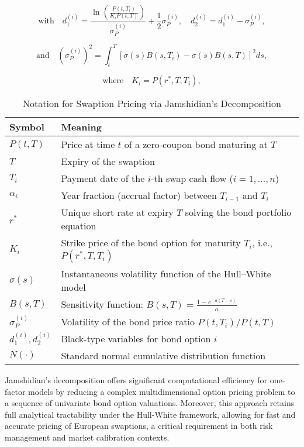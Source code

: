 \begin{equation}
\text{with} \quad d_1^{(i)} = \frac{\ln\left( \frac{P(t, T_i)}{K_i P(t, T)} \right)}{\sigma_P^{(i)}} + \frac{1}{2} \sigma_P^{(i)}, \quad d_2^{(i)} = d_1^{(i)} - \sigma_P^{(i)},
\end{equation}

\begin{equation}
\text{and} \quad \left( \sigma_P^{(i)} \right)^2 = \int_t^T \left[ \sigma(s) B(s, T_i) - \sigma(s) B(s, T) \right]^2 ds,
\end{equation}

\begin{equation}
\text{where} \quad K_i = P(r^*, T, T_i),
\end{equation}

\begin{table}[H]
\centering
\caption{Notation for Swaption Pricing via Jamshidian's Decomposition}
\begin{tabular}{ll}
\toprule
\textbf{Symbol} & \textbf{Meaning} \\
\midrule
$P(t, T)$ & Price at time $t$ of a zero-coupon bond maturing at $T$ \\
$T$ & Expiry of the swaption \\
$T_i$ & Payment date of the $i$-th swap cash flow ($i = 1, \dots, n$) \\
$\alpha_i$ & Year fraction (accrual factor) between $T_{i-1}$ and $T_i$ \\
$r^*$ & Unique short rate at expiry $T$ solving the bond portfolio equation \\
$K_i$ & Strike price of the bond option for maturity $T_i$, i.e., $P(r^*, T, T_i)$ \\
$\sigma(s)$ & Instantaneous volatility function of the Hull–White model \\
$B(s, T)$ & Sensitivity function: $B(s, T) = \frac{1 - e^{-a(T - s)}}{a}$ \\
$\sigma_P^{(i)}$ & Volatility of the bond price ratio $P(t, T_i)/P(t, T)$ \\
$d_1^{(i)}, d_2^{(i)}$ & Black-type variables for bond option $i$ \\
$N(\cdot)$ & Standard normal cumulative distribution function \\
\bottomrule
\end{tabular}
\end{table}

Jamshidian’s decomposition offers significant computational efficiency for one-factor models by reducing a complex multidimensional option pricing problem to a sequence of univariate bond option valuations. Moreover, this approach retains full analytical tractability under the Hull-White framework, allowing for fast and accurate pricing of European swaptions, a critical requirement in both risk management and market calibration contexts.

